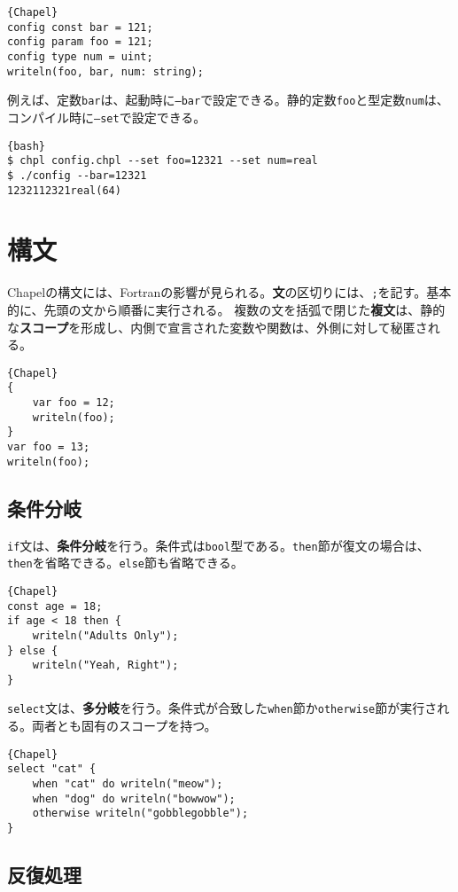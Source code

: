 \documentclass[10pt,a4paper]{book}
\begin{document}
\begin{Verbatim}{Chapel}
config const bar = 121;
config param foo = 121;
config type num = uint;
writeln(foo, bar, num: string);
\end{Verbatim}

例えば、定数\texttt{bar}は、起動時に\texttt{--bar}で設定できる。静的定数\texttt{foo}と型定数\texttt{num}は、コンパイル時に\texttt{--set}で設定できる。

\begin{Verbatim}{bash}
$ chpl config.chpl --set foo=12321 --set num=real
$ ./config --bar=12321
1232112321real(64)
\end{Verbatim}

\chapter{構文}

Chapelの構文には、Fortranの影響が見られる。\textbf{文}の区切りには、\texttt{;}を記す。基本的に、先頭の文から順番に実行される。
複数の文を括弧で閉じた\textbf{複文}は、静的な\textbf{スコープ}を形成し、内側で宣言された変数や関数は、外側に対して秘匿される。

\begin{Verbatim}{Chapel}
{
	var foo = 12;
	writeln(foo);
}
var foo = 13;
writeln(foo);
\end{Verbatim}

\section{条件分岐}

\texttt{if}文は、\textbf{条件分岐}を行う。条件式は\texttt{bool}型である。\texttt{then}節が復文の場合は、\texttt{then}を省略できる。\texttt{else}節も省略できる。

\begin{Verbatim}{Chapel}
const age = 18;
if age < 18 then {
	writeln("Adults Only");
} else {
	writeln("Yeah, Right");
}
\end{Verbatim}

\texttt{select}文は、\textbf{多分岐}を行う。条件式が合致した\texttt{when}節か\texttt{otherwise}節が実行される。両者とも固有のスコープを持つ。

\begin{Verbatim}{Chapel}
select "cat" {
	when "cat" do writeln("meow");
	when "dog" do writeln("bowwow");
	otherwise writeln("gobblegobble");
}
\end{Verbatim}

\section{反復処理}
\end{document}
